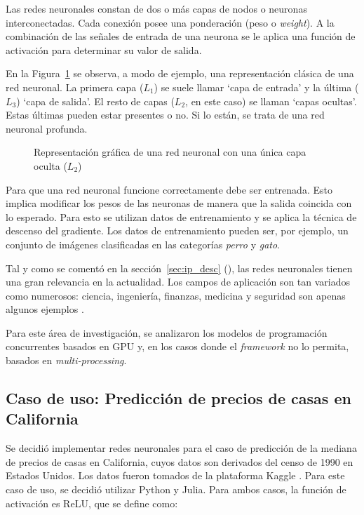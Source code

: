 \documentclass[11pt]{article}
\let\Oldsubsection\subsection
\renewcommand{\subsection}{\FloatBarrier\Oldsubsection}
\newcommand{\english}[1]{\textit{#1}}
\newcommand{\technical}[1]{\textit{#1}}
\begin{document}
Las redes neuronales constan de dos o más capas de nodos o neuronas interconectadas. Cada conexión posee una ponderación (peso o \english{weight}). A la combinación de las señales de entrada de una neurona se le aplica una función de activación para determinar su valor de salida.

En la Figura~\ref{fig:nn:diagram} se observa, a modo de ejemplo, una representación clásica de una red neuronal. La primera capa ($L_1$) se suele llamar `capa de entrada' y la última ($L_3$) `capa de salida'. El resto de capas ($L_2$, en este caso) se llaman `capas ocultas'. Estas últimas pueden estar presentes o no. Si lo están, se trata de una red neuronal profunda.

 \begin{figure}[h]
    \centering
    
    \caption{Representación gráfica de una red neuronal con una única capa oculta ($L_2$)}
    \label{fig:nn:diagram}
\end{figure}

Para que una red neuronal funcione correctamente debe ser entrenada. Esto implica modificar los pesos de las neuronas de manera que la salida coincida con lo esperado. Para esto se utilizan datos de entrenamiento y se aplica la técnica de descenso del gradiente. Los datos de entrenamiento pueden ser, por ejemplo, un conjunto de imágenes clasificadas en las categorías \technical{perro} y \technical{gato}.

Tal y como se comentó en la sección~\ref{sec:ip_desc} (), las redes neuronales tienen una gran relevancia en la actualidad. Los campos de aplicación son tan variados como numerosos: ciencia, ingeniería, finanzas, medicina y seguridad son apenas algunos ejemplos \cite{nn:survey}.

Para este área de investigación, se analizaron los modelos de programación concurrentes basados en GPU y, en los casos donde el \english{framework} no lo permita, basados en \english{multi-processing}. 

\subsection{Caso de uso: Predicción de precios de casas en California}

Se decidió implementar redes neuronales para el caso de predicción de la mediana de precios de casas en California, cuyos datos son derivados del censo de 1990 en Estados Unidos. Los datos fueron tomados de la plataforma Kaggle \cite{com:kaggle}. Para este caso de uso, se decidió utilizar Python y Julia. Para ambos casos, la función de activación es ReLU, que se define como:
\end{document}
